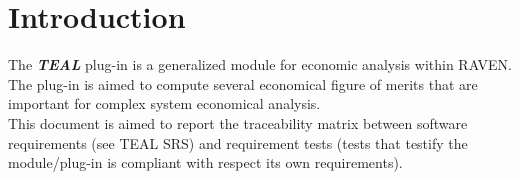 \section{Introduction}
The \textbf{\textit{TEAL}} plug-in is a generalized module for economic analysis within RAVEN.
\\The plug-in is aimed to compute several economical figure of merits that are important for complex
system economical analysis.
\\This document is aimed to report the traceability matrix between software requirements
(see TEAL SRS) and requirement tests (tests that testify the module/plug-in is compliant
with respect its own requirements).
